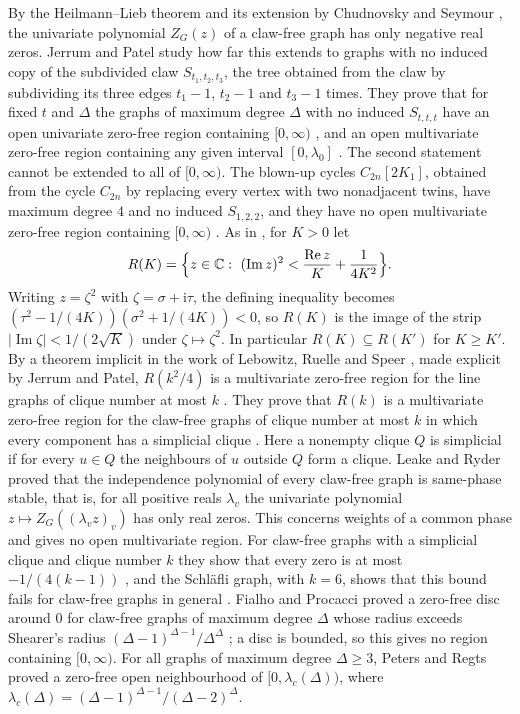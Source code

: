 \documentclass[11pt]{article}
\theoremstyle{remark}
\renewcommand{\Re}{\operatorname{Re}}
\renewcommand{\Im}{\operatorname{Im}}
\begin{document}
By the Heilmann--Lieb theorem \cite{HL} and its extension by Chudnovsky and Seymour \cite{CS}, the univariate
polynomial $Z_G(z)$ of a claw-free graph has only negative real zeros. Jerrum and Patel \cite{JP} study how far this
extends to graphs with no induced copy of the subdivided claw $S_{t_1,t_2,t_3}$, the tree obtained from the claw by
subdividing its three edges $t_1-1$, $t_2-1$ and $t_3-1$ times. They prove that for fixed $t$ and $\Delta$ the graphs of
maximum degree $\Delta$ with no induced $S_{t,t,t}$ have an open univariate zero-free region containing
$[0,\infty)$ \cite[Theorem~3]{JP}, and an open multivariate zero-free region containing any given interval
$[0,\lambda_0]$ \cite[Theorem~5]{JP}. The second statement cannot be extended to all of $[0,\infty)$. The blown-up
cycles $C_{2n}[2K_1]$, obtained from the cycle $C_{2n}$ by replacing every vertex with two nonadjacent twins, have maximum degree $4$ and no induced $S_{1,2,2}$, and they have no open multivariate zero-free
region containing $[0,\infty)$ \cite[Lemma~15]{JP}. As in \cite{JP}, for $K>0$ let
\[
R(K)=\Bigl\{z\in\mathbb C:\ (\Im z)^2<\frac{\Re z}{K}+\frac1{4K^2}\Bigr\}.
\]
Writing $z=\zeta^2$ with $\zeta=\sigma+\mathrm i\tau$, the defining inequality becomes
$(\tau^2-1/(4K))(\sigma^2+1/(4K))<0$, so $R(K)$ is the image of the strip $|\Im\zeta|<1/(2\sqrt K)$ under
$\zeta\mapsto\zeta^2$. In particular $R(K)\subseteq R(K')$ for $K\ge K'$.
By a theorem implicit in the work of Lebowitz, Ruelle and Speer \cite{LRS}, made explicit by Jerrum and Patel,
$R(k^2/4)$ is a multivariate zero-free region for the line graphs of clique number at most $k$ \cite[Theorem~4]{JP}. They prove that $R(k)$ is
a multivariate zero-free region for the claw-free graphs of clique number at most $k$ in which every component has a
simplicial clique \cite[Theorem~6]{JP}. Here a nonempty clique $Q$ is simplicial if for every $u\in Q$ the neighbours
of $u$ outside $Q$ form a clique. Leake and Ryder \cite{LR} proved that the independence polynomial of every claw-free graph is
same-phase stable, that is, for all positive reals $\lambda_v$ the univariate polynomial $z\mapsto Z_G((\lambda_vz)_v)$
has only real zeros. This concerns weights of a common phase and gives no open multivariate region. For claw-free
graphs with a simplicial clique and clique number $k$ they show that every zero is at most $-1/(4(k-1))$
\cite[Corollary~4.18]{LR}, and the Schl\"afli graph, with $k=6$, shows that this bound fails for claw-free graphs
in general \cite[Section~5.1]{LR}. Fialho and Procacci \cite{FP} proved a zero-free disc around $0$ for claw-free
graphs of maximum degree $\Delta$ whose radius exceeds Shearer's radius $(\Delta-1)^{\Delta-1}/\Delta^{\Delta}$
\cite{Sh85}; a disc is bounded, so this gives no region containing $[0,\infty)$. For all graphs of maximum degree
$\Delta\ge3$, Peters and Regts \cite{PR} proved a zero-free open neighbourhood of $[0,\lambda_c(\Delta))$, where
$\lambda_c(\Delta)=(\Delta-1)^{\Delta-1}/(\Delta-2)^{\Delta}$.
\end{document}

